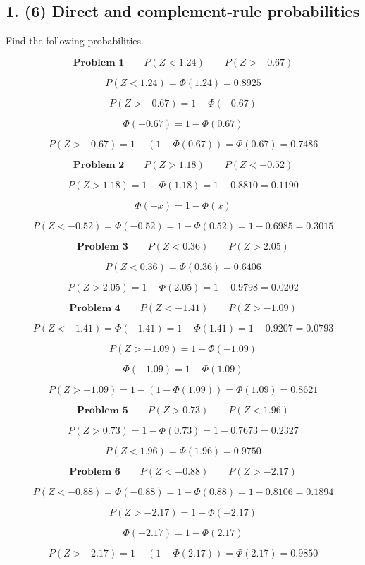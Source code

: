 	
	\subsection*{1. (6) Direct and complement-rule probabilities}
	\label{subsec:standard-normal-table-problems-c5-1}
	Find the following probabilities.
	
	\[
	\textbf{Problem 1}
	\qquad
	P(Z<1.24)
	\qquad
	P(Z>-0.67)
	\]
	
	\[
	P(Z<1.24)=\Phi(1.24)=0.8925
	\]
	
	\[
	P(Z>-0.67)=1-\Phi(-0.67)
	\]
	
	\[
	\Phi(-0.67)=1-\Phi(0.67)
	\]
	
	\[
	P(Z>-0.67)=1-\left(1-\Phi(0.67)\right)=\Phi(0.67)=0.7486
	\]
	
	\[
	\textbf{Problem 2}
	\qquad
	P(Z>1.18)
	\qquad
	P(Z<-0.52)
	\]
	
	\[
	P(Z>1.18)=1-\Phi(1.18)=1-0.8810=0.1190
	\]
	
	\[
	\Phi(-x)=1-\Phi(x)
	\]
	
	\[
	P(Z<-0.52)=\Phi(-0.52)=1-\Phi(0.52)=1-0.6985=0.3015
	\]
	
	\[
	\textbf{Problem 3}
	\qquad
	P(Z<0.36)
	\qquad
	P(Z>2.05)
	\]
	
	\[
	P(Z<0.36)=\Phi(0.36)=0.6406
	\]
	
	\[
	P(Z>2.05)=1-\Phi(2.05)=1-0.9798=0.0202
	\]
	
	\[
	\textbf{Problem 4}
	\qquad
	P(Z<-1.41)
	\qquad
	P(Z>-1.09)
	\]
	
	\[
	P(Z<-1.41)=\Phi(-1.41)=1-\Phi(1.41)=1-0.9207=0.0793
	\]
	
	\[
	P(Z>-1.09)=1-\Phi(-1.09)
	\]
	
	\[
	\Phi(-1.09)=1-\Phi(1.09)
	\]
	
	\[
	P(Z>-1.09)=1-\left(1-\Phi(1.09)\right)=\Phi(1.09)=0.8621
	\]
	
	\[
	\textbf{Problem 5}
	\qquad
	P(Z>0.73)
	\qquad
	P(Z<1.96)
	\]
	
	\[
	P(Z>0.73)=1-\Phi(0.73)=1-0.7673=0.2327
	\]
	
	\[
	P(Z<1.96)=\Phi(1.96)=0.9750
	\]
	
	\[
	\textbf{Problem 6}
	\qquad
	P(Z<-0.88)
	\qquad
	P(Z>-2.17)
	\]
	
	\[
	P(Z<-0.88)=\Phi(-0.88)=1-\Phi(0.88)=1-0.8106=0.1894
	\]
	
	\[
	P(Z>-2.17)=1-\Phi(-2.17)
	\]
	
	\[
	\Phi(-2.17)=1-\Phi(2.17)
	\]
	
	\[
	P(Z>-2.17)=1-\left(1-\Phi(2.17)\right)=\Phi(2.17)=0.9850
	\]
	
